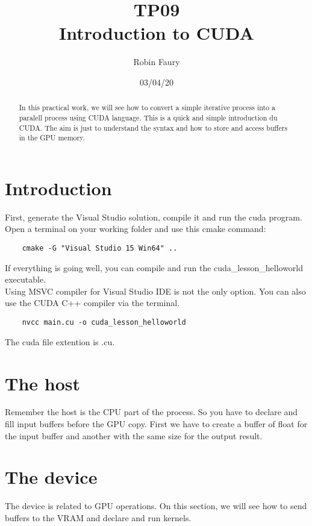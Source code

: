 \documentclass{article}
\begin{document}
\title{TP09\\Introduction to CUDA}
\author{Robin Faury}
\date{03/04/20}
\maketitle

\begin{abstract}
	In this practical work, we will see how to convert a simple iterative process into a paralell process using CUDA language. This is a quick and simple introduction du CUDA. The aim is just to understand the syntax and how to store and access buffers in the GPU memory.
\end{abstract}

\section{Introduction}
First, generate the Visual Studio solution, compile it and run the cuda program.\\
Open a terminal on your working folder and use this cmake command:
\begin{lstlisting}
	cmake -G "Visual Studio 15 Win64" ..
\end{lstlisting}
If everything is going well, you can compile and run the cuda\_lesson\_helloworld executable.\\
Using MSVC compiler for Visual Studio IDE is not the only option. You can also use the CUDA C++ compiler via the terminal. 
\begin{lstlisting}
	nvcc main.cu -o cuda_lesson_helloworld
\end{lstlisting}
The cuda file extention is .cu.

\section{The host}
Remember the host is the CPU part of the process. So you have to declare and fill input buffers before the GPU copy. First we have to create a buffer of float for the input buffer and another with the same size for the output result.

\section{The device}
The device is related to GPU operations. On this section, we will see how to send buffers to the VRAM and declare and run kernels. 
\end{document}

